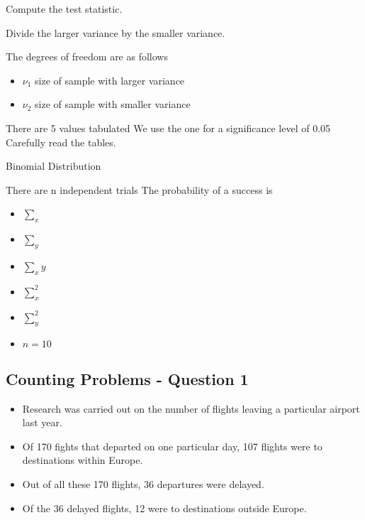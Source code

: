 \documentclass[]{report}
\begin{document}
\begin{enumerate}[(i)]
Compute the test statistic.

Divide the larger variance by the smaller variance.

The degrees of freedom are as follows
\begin{itemize}
	\item $\nu_1$ size of sample with larger variance
	\item $\nu_2$ size of sample with smaller variance
\end{itemize}

There are 5 values tabulated
We use the one for a significance level of 0.05
Carefully read the tables.


Binomial Distribution

There are n independent trials
The probability of a success is
\begin{itemize}
	\item	$\sum_x$
	\item 				$\sum_y$
	\item				$\sum_xy$
	\item				$\sum_x^2$
	\item 				$\sum_y^2$
	\item 				$ n=10$
\end{itemize}		






\subsection{Counting Problems - Question 1}

\begin{itemize}
	\item Research was carried out on the number of flights leaving a particular airport last year. 
	
	\item Of 170 fights that departed on one particular day, 107 flights were to destinations within Europe. 
	\item Out of all these 170 flights, 36 departures were delayed. 
	
	\item Of the 36 delayed flights, 12 were to destinations outside Europe. 
	
	
\end{itemize}





\end{enumerate}
\end{document}
